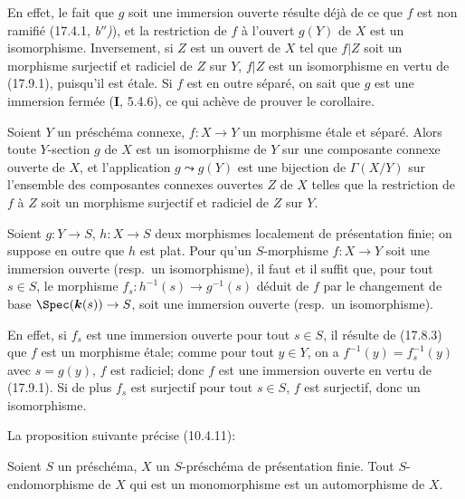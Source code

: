 En effet, le fait que $g$ soit une immersion ouverte résulte déjà de ce que $f$ est non ramifié (17.4.1, \emph{b$''$)}), et la restriction de $f$ à l'ouvert $g(Y)$ de $X$ est un isomorphisme. Inversement, si $Z$ est un ouvert de $X$ tel que $f|Z$ soit un morphisme surjectif et radiciel de $Z$ sur $Y$, $f|Z$ est un isomorphisme en vertu de (17.9.1), puisqu'il est étale. Si $f$ est en outre séparé, on sait que $g$ est une immersion fermée (\textbf{I}, 5.4.6), ce qui achève de prouver le corollaire.

\begin{corollary}[17.9.4]
\label{IV.17.9.4}
Soient $Y$ un préschéma connexe, $f:X\to Y$ un morphisme étale et séparé. Alors toute $Y$-section $g$ de $X$ est un isomorphisme de $Y$ sur une composante connexe ouverte de $X$, et l'application $g\leadsto g(Y)$ est une bijection de $\Gamma(X/Y)$ sur l'ensemble des composantes connexes ouvertes $Z$ de $X$ telles que la restriction de $f$ à $Z$ soit un morphisme surjectif et radiciel de $Z$ sur $Y$.
\end{corollary}

\begin{corollary}[17.9.5]
\label{IV.17.9.5}
Soient $g:Y\to S$, $h:X\to S$ deux morphismes localement de présentation finie; on suppose en outre que $h$ est \textup{plat}. Pour qu'un $S$-morphisme $f:X\to Y$ soit une immersion ouverte \textup{(resp.}\ un isomorphisme\textup{)}, il faut et il suffit que, pour tout $s\in S$, le morphisme $f_s:h^{-1}(s)\to g^{-1}(s)$ déduit de $f$ par le changement de base $\Spec(\boldsymbol{k}(s))\to S$, soit une immersion ouverte \textup{(resp.}\ un isomorphisme\textup{)}.
\end{corollary}

En effet, si $f_s$ est une immersion ouverte pour tout $s\in S$, il résulte de (17.8.3) que $f$ est un morphisme étale; comme pour tout $y\in Y$, on a $f^{-1}(y)=f_s^{-1}(y)$ avec $s=g(y)$, $f$ est radiciel; donc $f$ est une immersion ouverte en vertu de (17.9.1). Si de plus $f_s$ est surjectif pour tout $s\in S$, $f$ est surjectif, donc un isomorphisme.

La proposition suivante précise (10.4.11):

\begin{proposition}[17.9.6]
Soient $S$ un préschéma, $X$ un $S$-préschéma de présentation finie. Tout $S$-endomorphisme de $X$ qui est un monomorphisme est un automorphisme de $X$.
\end{proposition}

